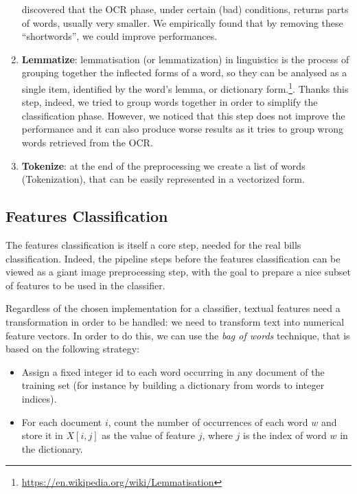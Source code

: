 \documentclass[10pt,twocolumn,letterpaper]{article}
\begin{document}
\begin{enumerate}
    discovered that the OCR phase, under certain (bad) conditions,
    returns parts of words, usually very smaller. We empirically found
    that by removing these ``shortwords'', we could improve
    performances.
  \item \textbf{Lemmatize}: lemmatisation (or lemmatization) in
    linguistics is the process of grouping together the inflected
    forms of a word, so they can be analysed as a single item,
    identified by the word's lemma, or dictionary
    form.\footnote{\href{
        https://en.wikipedia.org/wiki/Lemmatisation}{
        https://en.wikipedia.org/wiki/Lemmatisation}}. Thanks this
    step, indeed, we tried to group words together in order to
    simplify the classification phase. However, we noticed that this
    step does not improve the performance and it can also produce
    worse results as it tries to group wrong words retrieved from the
    OCR.
  \item \textbf{Tokenize}: at the end of the preprocessing we create a
    list of words (Tokenization), that can be easily represented in a
    vectorized form.
\end{enumerate}

\subsection{Features Classification}
\label{subsec:classification}

The features classification is itself a core step, needed for the real
bills classification. Indeed, the pipeline steps before the features
classification can be viewed as a giant image preprocessing step, with
the goal to prepare a nice subset of features to be used in the
classifier.

Regardless of the chosen implementation for a classifier, textual
features need a transformation in order to be handled: we need to
transform text into numerical feature vectors. In order to do this, we
can use the \emph{bag of words} technique, that is based on the
following strategy:

\begin{itemize}
  \item Assign a fixed integer id to each word occurring in any
    document of the training set (for instance by building a
    dictionary from words to integer indices).
  \item For each document $i$, count the number of occurrences of each
    word $w$ and store it in $X[i, j]$ as the value of feature $j$,
    where $j$ is the index of word $w$ in the dictionary.
\end{itemize}
\end{document}
